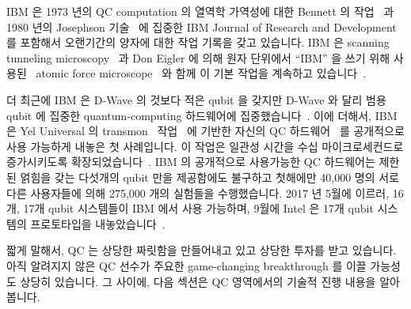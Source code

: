 IBM 은 1973 년의 QC computation 의 열역학 가역성에 대한 Bennett 의
작업~\cite{Bennett:1973:LRC:1664562.1664568} 과 1980 년의 Josephson
기술~\cite{1980:1663086} 에 집중한 IBM Journal of Research and Development 를
포함해서 오랜기간의 양자에 대한 작업 기록을 갖고 있습니다.
IBM 은 scanning tunneling microscopy~\cite{Binnig1982SurfaceSTM} 과 Don Eigler
에 의해 원자 단위에서 ``IBM'' 을 쓰기 위해
사용된~\cite{MalcolmWBrowne1990AFM-IBM} atomic force
microscope~\cite{1986PhRvL..56..930B} 와 함께 이 기본 작업을 계속하고
있습니다~\cite{Binnig1982SurfaceSTM}.

더 최근에 IBM 은 D-Wave 의 것보다 적은 qubit 을 갖지만 D-Wave 와 달리 범용
qubit 에 집중한 quantum-computing 하드웨어에
집중했습니다~\cite{BradJones2017IBM-QC-Announce,RobertHackett2017IBM-QC-Announce,AgamShah2017IBM-QC-50-qubit,DarioGill2017IBM-Universal-QC}.
이에 더해서, IBM 은 Yel Universal 의 transmon~\cite{WikipediaTransMon}
작업~\cite{PhysRevA.76.042319} 에 기반한 자신의 QC
하드웨어~\cite{IBM2016QuantumExperience,ArsTechnica2016IBMQuantumExperience,MikeVizard2017IBM-QC-Cloud}
를 공개적으로 사용 가능하게 내놓은 첫 사례입니다.
이 작업은 일관성 시간을 수십 마이크로세컨드로 증가시키도록
확장되었습니다~\cite{PhysRevLett.107.240501,PhysRevLett.111.080502,PhysRevB.86.100506}.
IBM 의 공개적으로 사용가능한 QC 하드웨어는 제한된 얽힘을 갖는 다섯개의 qubit
만을 제공함에도 불구하고 첫해에만 40,000 명의 서로 다른 사용자들에 의해 275,000
개의 실험들을 수행했습니다.
2017 년 5월에 이르러, 16개, 17개 qubit 시스템들이 IBM 에서 사용 가능하며, 9월에
Intel 은 17개 qubit 시스템의 프로토타입을
내놓았습니다~\cite{Intel2017delivers17qubit}.

짧게 말해서, QC 는 상당한 짜릿함을 만들어내고 있고 상당한 투자를 받고 있습니다.
아직 알려지지 않은 QC 선수가 주요한 game-changing breakthrough 를 이끌 가능성도
상당히 있습니다.
그 사이에, 다음 섹션은 QC 영역에서의 기술적 진행 내용을 알아봅니다.
\iffalse

